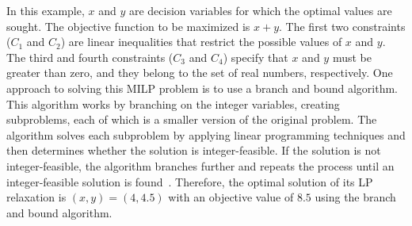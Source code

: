     
    In this example, $x$ and $y$ are decision variables for which the optimal values are sought. The objective function to be maximized is $x + y$. The first two constraints ($C_1$ and $C_2$) are linear inequalities that restrict the possible values of $x$ and $y$. The third and fourth constraints ($C_3$ and $C_4$) specify that $x$ and $y$ must be greater than zero, and they belong to the set of real numbers, respectively.
    One approach to solving this MILP problem is to use a branch and bound algorithm. This algorithm works by branching on the integer variables, creating subproblems, each of which is a smaller version of the original problem. The algorithm solves each subproblem by applying linear programming techniques and then determines whether the solution is integer-feasible. If the solution is not integer-feasible, the algorithm branches further and repeats the process until an integer-feasible solution is found~\cite{lawler1966branch}. Therefore, the optimal solution of its LP relaxation is $(x, y) = (4, 4.5)$ with an objective value of $8.5$ using the branch and bound algorithm.
    
    
    
    
    
    
    
